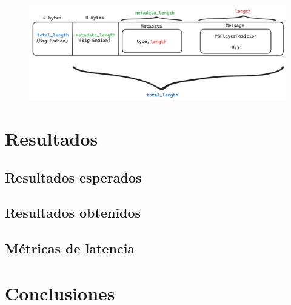 \documentclass[12pt]{article}
\begin{document}
\begin{figure}[htbp]
    \centering
    \includegraphics[width=1.0\textwidth]{../assets/protobuf.png}
\end{figure}

\section{Resultados}

\subsection{Resultados esperados}

\subsection{Resultados obtenidos}

\subsection{Métricas de latencia}

\section{Conclusiones}
\end{document}
